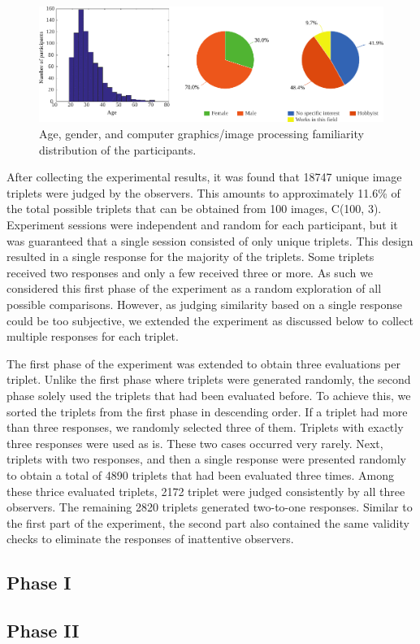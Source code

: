 \begin{figure}
\begin{center}
\includegraphics[width=\textwidth]{figures/chapter3/age_gender_cgi.pdf}
\caption{Age, gender, and computer graphics/image processing familiarity distribution of the participants.
}
\label{fig:age_gender_cgi}
\end{center}
\end{figure}

After collecting the experimental results, it was found that 18747 unique image triplets were judged by the observers. This amounts to approximately 11.6\% of the total possible triplets that can be obtained from 100 images, C(100, 3). Experiment sessions were independent and random for each participant, but it was guaranteed that a single session consisted of only unique triplets. This design resulted in a single response for the majority of the triplets. Some triplets received two responses and only a few received three or more. As such we considered this first phase of the experiment as a random exploration of all possible comparisons. However, as judging similarity based on a single response could be too subjective, we extended the experiment as discussed below to collect multiple responses for each triplet.

The first phase of the experiment was extended to obtain three evaluations per triplet. Unlike the first phase where triplets were generated randomly, the second phase solely used the triplets that had been evaluated before. To achieve this, we sorted the triplets from the first phase in descending order. If a triplet had more than three responses, we randomly selected three of them. Triplets with exactly three responses were used as is. These two cases occurred very rarely. Next, triplets with two responses, and then a single response were presented randomly to obtain a total of 4890 triplets that had been evaluated three times. Among these thrice evaluated triplets, 2172 triplet were judged consistently by all three observers. The remaining 2820 triplets generated two-to-one responses. Similar to the first part of the experiment, the second part also contained the same validity checks to eliminate the responses of inattentive observers.
\subsection{Phase I}
\subsection{Phase II}







